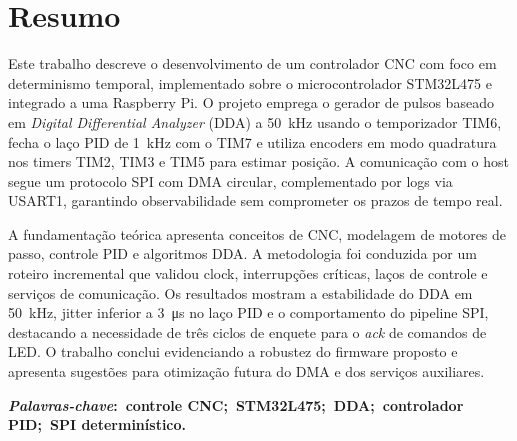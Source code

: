 \chapter*{Resumo}
\noindent Este trabalho descreve o desenvolvimento de um controlador CNC
com foco em determinismo temporal, implementado sobre o microcontrolador
STM32L475 e integrado a uma Raspberry Pi. O projeto emprega o gerador de
pulsos baseado em \emph{Digital Differential Analyzer} (DDA) a
\SI{50}{\kilo\hertz} usando o temporizador TIM6, fecha o laço PID de
\SI{1}{\kilo\hertz} com o TIM7 e utiliza encoders em modo quadratura nos
timers TIM2, TIM3 e TIM5 para estimar posição. A comunicação com o host
segue um protocolo SPI com DMA circular, complementado por logs via
USART1, garantindo observabilidade sem comprometer os prazos de tempo
real.

A fundamentação teórica apresenta conceitos de CNC, modelagem de motores
de passo, controle PID e algoritmos DDA. A metodologia foi conduzida por
um roteiro incremental que validou clock, interrupções críticas, laços
de controle e serviços de comunicação. Os resultados mostram a
estabilidade do DDA em \SI{50}{\kilo\hertz}, jitter inferior a
\SI{3}{\micro\second} no laço PID e o comportamento do pipeline SPI,
destacando a necessidade de três ciclos de enquete para o \emph{ack} de
comandos de LED. O trabalho conclui evidenciando a robustez do
firmware proposto e apresenta sugestões para otimização futura do DMA e
dos serviços auxiliares.

\vspace{5mm}

\noindent\textbf{\textit{Palavras-chave}:~controle CNC;~STM32L475;~DDA;~controlador PID;~SPI determinístico.}
